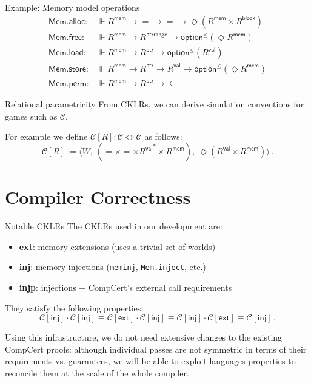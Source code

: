 \documentclass{beamer}
\newcommand{\kw}[1]{\ensuremath{ \mathsf{#1} }}
\begin{document}
\begin{frame}{Example: Memory model operations}
  \begin{align*}
      \kw{Mem.alloc} :
        &\Vdash R^\kw{mem} \rightarrow {=} \rightarrow {=} \rightarrow
        \Diamond (R^\kw{mem} \times R^\kw{block})
      \\
      \kw{Mem.free} :
        &\Vdash R^\kw{mem} \rightarrow R^\kw{ptrrange} \rightarrow
        \kw{option}^\le(\Diamond R^\kw{mem})
      \\
      \kw{Mem.load} :
        &\Vdash R^\kw{mem} \rightarrow R^\kw{ptr} \rightarrow
        \kw{option}^\le(R^\kw{val})
      \\
      \kw{Mem.store} :
        &\Vdash R^\kw{mem} \rightarrow R^\kw{ptr} \rightarrow R^\kw{val} \rightarrow
        \kw{option}^\le(\Diamond R^\kw{mem})
      \\
      \kw{Mem.perm} :
        &\Vdash R^\kw{mem} \rightarrow R^\kw{ptr} \rightarrow {\subseteq}
  \end{align*}
\end{frame}

\begin{frame}{Relational parametricity}
From CKLRs, we can derive simulation conventions
for games such as $\mathcal{C}$.

\vspace{1em}
For example
we define $\mathcal{C}[R] : \mathcal{C} \Leftrightarrow \mathcal{C}$
as follows:
\[
    \mathcal{C}[R] := \langle
      W, \:
      ({=} \times {=} \times {R^\kw{val}}^* \times R^\kw{mem}), \:
      \Diamond (R^\kw{val} \times R^\kw{mem})
    \rangle \,.
\]
\end{frame}

\section{Compiler Correctness}

\begin{frame}{Notable CKLRs}
The CKLRs used in our development are:
\begin{itemize}
  \item \textbf{ext}: memory extensions (uses a trivial set of worlds)
  \item \textbf{inj}: memory injections (\texttt{meminj},
    \texttt{Mem.inject}, etc.)
  \item \textbf{injp}: injections + CompCert's external call requirements
\end{itemize}

\vspace{1ex}
They satisfy the following properties:
\[
  \mathcal{C}[\kw{inj}] \cdot \mathcal{C}[\kw{inj}] \equiv
  \mathcal{C}[\kw{ext}] \cdot \mathcal{C}[\kw{inj}] \equiv
  \mathcal{C}[\kw{inj}] \cdot \mathcal{C}[\kw{ext}] \equiv
  \mathcal{C}[\kw{inj}] \,.
\]

Using this infrastructure,
we do not need extensive changes to the existing CompCert proofs:
although individual passes are not symmetric in terms of their
requirements vs. guarantees,
we will be able to exploit languages properties
to reconcile them at the scale of the whole compiler.
\end{frame}
\end{document}
